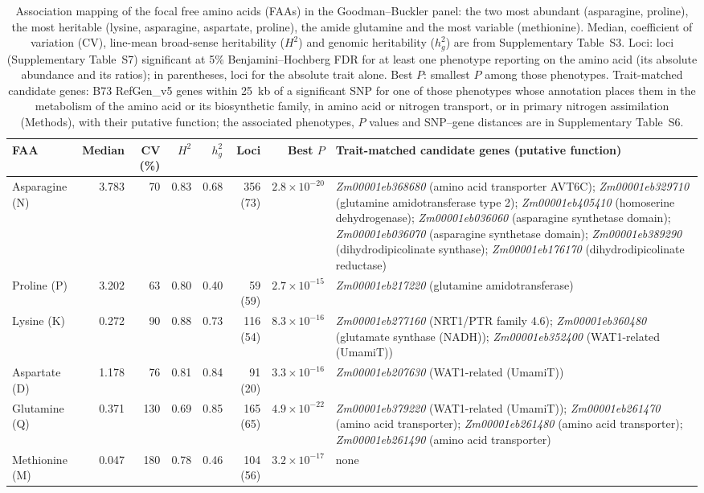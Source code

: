 \begin{table}[t]
\centering
\caption{Association mapping of the focal free amino acids (FAAs) in the Goodman--Buckler panel: the two most abundant (asparagine, proline), the most heritable (lysine, asparagine, aspartate, proline), the amide glutamine and the most variable (methionine). Median, coefficient of variation (CV), line-mean broad-sense heritability ($H^2$) and genomic heritability ($h^2_g$) are from Supplementary Table~S3. Loci: loci (Supplementary Table~S7) significant at 5\% Benjamini--Hochberg FDR for at least one phenotype reporting on the amino acid (its absolute abundance and its ratios); in parentheses, loci for the absolute trait alone. Best $P$: smallest $P$ among those phenotypes. Trait-matched candidate genes: B73 RefGen\_v5 genes within 25~kb of a significant SNP for one of those phenotypes whose annotation places them in the metabolism of the amino acid or its biosynthetic family, in amino acid or nitrogen transport, or in primary nitrogen assimilation (Methods), with their putative function; the associated phenotypes, $P$ values and SNP--gene distances are in Supplementary Table~S6.}
\label{tab:amino_gwas_focus}
\footnotesize
\setlength{\tabcolsep}{3pt}
\begin{tabularx}{\textwidth}{@{}l r r r r r r >{\raggedright\arraybackslash}X@{}}
\hline
FAA & Median & CV (\%) & $H^2$ & $h^2_g$ & Loci & Best $P$ & Trait-matched candidate genes (putative function) \\
\hline
Asparagine (N) & 3.783 & 70 & 0.83 & 0.68 & 356 (73) & $2.8\times10^{-20}$ & \textit{Zm00001eb368680} (amino acid transporter AVT6C); \textit{Zm00001eb329710} (glutamine amidotransferase type 2); \textit{Zm00001eb405410} (homoserine dehydrogenase); \textit{Zm00001eb036060} (asparagine synthetase domain); \textit{Zm00001eb036070} (asparagine synthetase domain); \textit{Zm00001eb389290} (dihydrodipicolinate synthase); \textit{Zm00001eb176170} (dihydrodipicolinate reductase) \\
Proline (P) & 3.202 & 63 & 0.80 & 0.40 & 59 (59) & $2.7\times10^{-15}$ & \textit{Zm00001eb217220} (glutamine amidotransferase) \\
Lysine (K) & 0.272 & 90 & 0.88 & 0.73 & 116 (54) & $8.3\times10^{-16}$ & \textit{Zm00001eb277160} (NRT1/PTR family 4.6); \textit{Zm00001eb360480} (glutamate synthase (NADH)); \textit{Zm00001eb352400} (WAT1-related (UmamiT)) \\
Aspartate (D) & 1.178 & 76 & 0.81 & 0.84 & 91 (20) & $3.3\times10^{-16}$ & \textit{Zm00001eb207630} (WAT1-related (UmamiT)) \\
Glutamine (Q) & 0.371 & 130 & 0.69 & 0.85 & 165 (65) & $4.9\times10^{-22}$ & \textit{Zm00001eb379220} (WAT1-related (UmamiT)); \textit{Zm00001eb261470} (amino acid transporter); \textit{Zm00001eb261480} (amino acid transporter); \textit{Zm00001eb261490} (amino acid transporter) \\
Methionine (M) & 0.047 & 180 & 0.78 & 0.46 & 104 (56) & $3.2\times10^{-17}$ & none \\
\hline
\end{tabularx}
\end{table}
